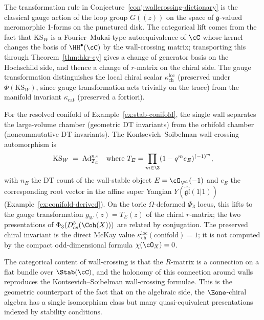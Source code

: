 \begin{remark}
\label{rem:categorical-gauge}
The transformation rule in Conjecture~\ref{conj:wallcrossing-dictionary} is the classical gauge action of the loop group $G(\!(z)\!)$ on the space of $\mathfrak{g}$-valued meromorphic 1-forms on the punctured disk. The categorical lift comes from the fact that $\mathrm{KS}_W$ is a Fourier--Mukai-type autoequivalence of $\cC$ whose kernel changes the basis of $\HH^\bullet(\cC)$ by the wall-crossing matrix; transporting this through Theorem~\ref{thm:hkr-cy} gives a change of generator basis on the Hochschild side, and thence a change of $r$-matrix on the chiral side. The gauge transformation distinguishes the local chiral scalar $\kappa_{\mathrm{ch}}^{\mathrm{loc}}$ (preserved under $\Phi(\mathrm{KS}_W)$, since gauge transformation acts trivially on the trace) from the manifold invariant $\kappa_{\mathrm{cat}}$ (preserved a fortiori).
\end{remark}

\begin{example}
\label{ex:conifold-rmatrix-gauge}
For the resolved conifold of Example~\ref{ex:stab-conifold}, the single wall separates the large-volume chamber (geometric DT invariants) from the orbifold chamber (noncommutative DT invariants). The Kontsevich--Soibelman wall-crossing automorphism is
\[
 \mathrm{KS}_W \;=\; \mathrm{Ad}_{T_E}^{n_E} \quad\text{where } T_E = \prod_{m \in \Z} (1 - q^m e_E)^{(-1)^m},
\]
with $n_E$ the DT count of the wall-stable object $E = \cO_{\P^1}(-1)$ and $e_E$ the corresponding root vector in the affine super Yangian $Y(\widehat{\mathfrak{gl}}(1|1))$ (Example~\ref{ex:conifold-derived}). On the toric $\Omega$-deformed $\Phi_3$ locus, this lifts to the gauge transformation $g_W(z) = T_E(z)$ of the chiral $r$-matrix; the two presentations of $\Phi_3(D^b_{cs}(\Coh(X)))$ are related by conjugation. The preserved chiral invariant is the direct McKay value $\kappa_{\mathrm{ch}}^{\mathrm{loc}}(\mathrm{conifold}) = 1$; it is not computed by the compact odd-dimensional formula $\chi(\cO_X)=0$.
\end{example}

The categorical content of wall-crossing is that the $R$-matrix is a connection on a flat bundle over $\Stab(\cC)$, and the holonomy of this connection around walls reproduces the Kontsevich--Soibelman wall-crossing formulae. This is the geometric counterpart of the fact that on the algebraic side, the $\Eone$-chiral algebra has a single isomorphism class but many quasi-equivalent presentations indexed by stability conditions.

